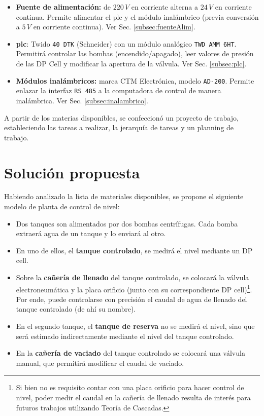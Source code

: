 \begin{itemize}
  \item \textbf{Fuente de alimentación:}
  de $220\,V$ en corriente alterna a $24\,V$ en corriente continua.
  Permite alimentar el \gls{plc} y el módulo inalámbrico (previa conversión a
  $5\,V$ en corriente continua).
  Ver Sec. \ref{subsec:fuenteAlim}.

  \item{\textbf{\gls{plc}}}: Twido \verb|40 DTK| (Schneider) con un módulo
  analógico \verb|TWD AMM 6HT|.
  Permitirá controlar las bombas (encendido/apagado), 
  leer valores de presión de las DP Cell y modificar la apertura de la 
  válvula. Ver Sec. \ref{subsec:plc}.

  \item \textbf{Módulos inalámbricos:} marca CTM Electrónica,
  modelo \verb|AD-200|.
  Permite enlazar la interfaz \verb|RS 485| a la computadora de control
  de manera inalámbrica. Ver Sec. \ref{subsec:inalambrico}.
\end{itemize}

A partir de los materias disponibles, se confeccionó
un proyecto de trabajo, estableciendo las tareas a realizar, la jerarquía de
tareas y un planning de trabajo.

\section{Solución propuesta}
\label{sec:SolucionPropuesta}

Habiendo analizado la lista de materiales disponibles, se propone el siguiente
modelo de planta de control de nivel:
\begin{itemize}
 \item Dos tanques son alimentados por dos bombas centrífugas.
 Cada bomba extraerá agua de un tanque y lo enviará al otro.
 \item En uno de ellos, el \textbf{tanque controlado}, se medirá el nivel
 mediante un DP cell.
 \item Sobre la \textbf{cañería de llenado} del tanque controlado, se
 colocará la válvula electroneumática y la placa orificio (junto
con su correspondiente DP cell)\footnote{Si bien no es  requisito contar con
una placa orificio para hacer  control de nivel,  poder medir el caudal en la
cañería de llenado resulta  de  interés para  futuros trabajos  utilizando
Teoría de Cascadas.}.
 Por ende, puede controlarse con precisión el caudal de agua de llenado del
 tanque controlado (de ahí su nombre).
 \item En el segundo tanque, el \textbf{tanque de reserva} no se medirá
 el  nivel, sino que será estimado indirectamente mediante el nivel del tanque
 controlado.
 \item En la \textbf{cañería de vaciado} del tanque controlado se colocará una
válvula manual, que permitirá modificar el caudal de vaciado.
\end{itemize}


